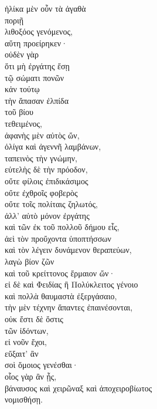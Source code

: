 {\large
\begin{greek}
\noindent ἡλίκα μὲν οὖν τὰ ἀγαθὰ \\
ποριῇ \\
\tabto{2em} λιθοξόος γενόμενος, \\
αὕτη προείρηκεν· \\
\tabto{2em} οὐδὲν γὰρ \\
\tabto{4em} ὅτι μὴ ἐργάτης ἔσῃ \\
\tabto{6em} τῷ σώματι πονῶν \\
\tabto{4em} κἀν τούτῳ \\
\tabto{4em} τὴν ἅπασαν ἐλπίδα \\
\tabto{6em} τοῦ βίου \\
\tabto{4em} τεθειμένος, \\
\tabto{4em} ἀφανὴς μὲν αὐτὸς ὤν,\\
\tabto{6em} ὀλίγα καὶ ἀγεννῆ λαμβάνων, \\
\tabto{6em} ταπεινὸς τὴν γνώμην, \\
\tabto{6em} εὐτελὴς δὲ τὴν πρόοδον, \\
\tabto{6em} οὔτε φίλοις ἐπιδικάσιμος\\
\tabto{6em} οὔτε ἐχθροῖς φοβερὸς \\
\tabto{6em} οὔτε τοῖς πολίταις ζηλωτός, \\
\tabto{6em} ἀλλ' αὐτὸ μόνον ἐργάτης \\
\tabto{8em} καὶ τῶν ἐκ τοῦ πολλοῦ δήμου εἷς, \\
\tabto{8em} ἀεὶ τὸν προὔχοντα ὑποπτήσσων \\
\tabto{8em} καὶ τὸν λέγειν δυνάμενον θεραπεύων, \\
\tabto{8em} λαγὼ βίον ζῶν \\
\tabto{8em} καὶ τοῦ κρείττονος ἕρμαιον ὤν· \\
εἰ δὲ καὶ Φειδίας ἢ Πολύκλειτος γένοιο \\
\tabto{2em} καὶ πολλὰ θαυμαστὰ ἐξεργάσαιο, \\
τὴν μὲν τέχνην ἅπαντες ἐπαινέσονται, \\
οὐκ ἔστι δὲ ὅστις \\
\tabto{2em} τῶν ἰδόντων, \\
εἰ νοῦν ἔχοι, \\
εὔξαιτ' ἂν \\
\tabto{2em} σοὶ ὅμοιος γενέσθαι· \\
οἷος γὰρ ἂν ᾖς, \\
\tabto{2em} βάναυσος καὶ χειρῶναξ καὶ ἀποχειροβίωτος \\
νομισθήσῃ.\\

\end{greek}
}

